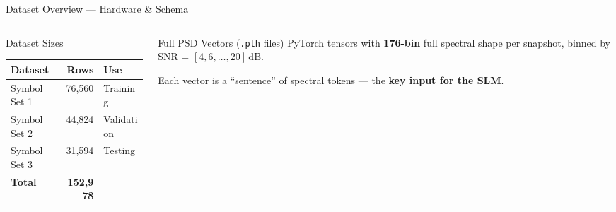 \documentclass[aspectratio=169, 10pt]{beamer}
\begin{document}
\begin{frame}{Dataset Overview --- Hardware \& Schema}
\begin{columns}[T]
\begin{column}{0.48\textwidth}
\begin{block}{Dataset Sizes}
\footnotesize
\renewcommand{\arraystretch}{1.2}
\begin{tabular}{@{}lrl@{}}
\toprule
\textbf{Dataset} & \textbf{Rows} & \textbf{Use} \\
\midrule
Symbol Set 1 & 76{,}560 & Training \\
Symbol Set 2 & 44{,}824 & Validation \\
Symbol Set 3 & 31{,}594 & Testing \\
\midrule
\textbf{Total} & \textbf{152{,}978} & \\
\bottomrule
\end{tabular}
\end{block}
\end{column}

\begin{column}{0.48\textwidth}
\begin{exampleblock}{Full PSD Vectors (\texttt{.pth} files)}
\footnotesize
PyTorch tensors with \textbf{176-bin} full spectral shape per snapshot, binned by SNR = $[4, 6, \ldots, 20]$\,dB.

\smallskip
Each vector is a ``sentence'' of spectral tokens --- the \textbf{key input for the SLM}.
\end{exampleblock}
\end{column}
\end{columns}
\end{frame}


\end{document}
